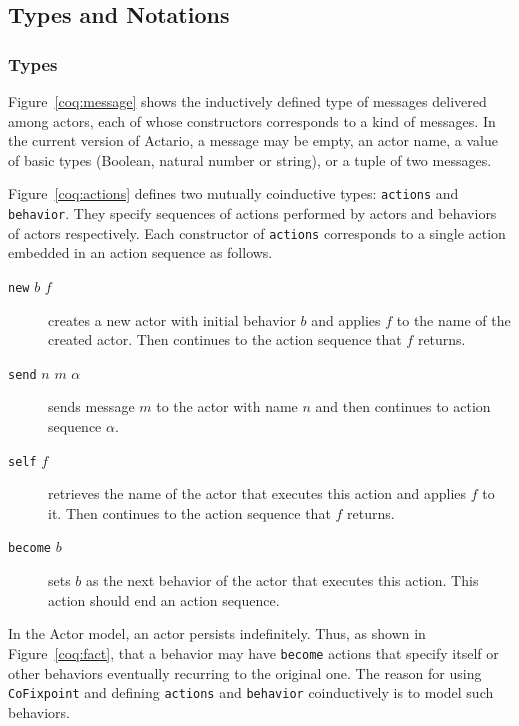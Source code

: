 \subsection{Types and Notations}\label{sec:typesandnotations}

\subsubsection{Types}

Figure~\ref{coq:message} shows the inductively defined type of messages delivered
among actors, each of whose constructors corresponds to a kind of
messages.  In the current version of Actario, a message may be empty,
an actor name, a value of basic types (Boolean, natural number or
string), or a tuple of two messages.

Figure~\ref{coq:actions} defines two mutually coinductive types:
\lstinline|actions| and \lstinline|behavior|. They specify sequences
of actions performed by actors and behaviors of actors respectively.
Each constructor of \lstinline|actions| corresponds to a single action embedded in
an action sequence as follows.
\begin{description}

\item[\texttt{new} \(b\) \(f\)] creates a new actor with initial
  behavior \(b\) and applies \(f\) to the name of the created
  actor. Then continues to the action sequence that \(f\) returns.

\item[\texttt{send} \(n\) \(m\) \(\alpha\)] sends message \(m\) to the
  actor with name \(n\) and then continues to action sequence
  \(\alpha\).

\item[\texttt{self} \(f\)] retrieves the name of the actor that executes this
  action and applies \(f\) to it. Then continues to the action sequence
  that \(f\) returns.

\item[\texttt{become} \(b\)] sets \(b\) as the next behavior of the
  actor that executes this action. This action should end an action
  sequence.
\end{description}

In the Actor model, an actor persists indefinitely. Thus, as shown in
Figure~\ref{coq:fact}, that a behavior may have \lstinline|become|
actions that specify itself or other behaviors eventually recurring to
the original one.  The reason for using \lstinline|CoFixpoint| and
defining \lstinline|actions| and \lstinline|behavior| coinductively is
to model such behaviors.


